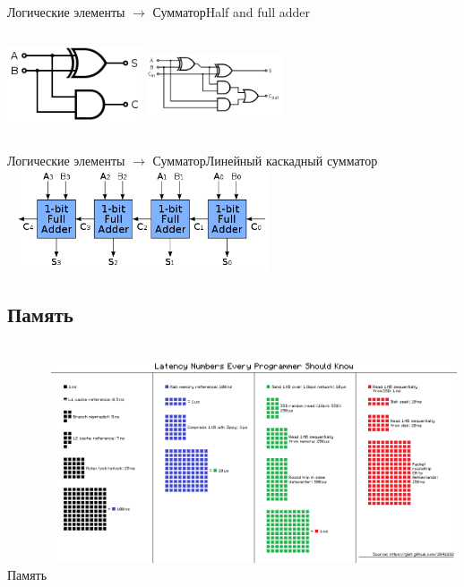 \begin{frame}[fragile]{Логические элементы $\rightarrow$ Сумматор}{Half and full adder}
\begin{multicols}{2}
\includegraphics[width=4cm, height=3cm]{Term_1/Source/Pirctures/Half_Adder.png}
\vfill\eject
\includegraphics[width=4cm, height=3cm]{Term_1/Source/Pirctures/Full_Adder.png}
\end{multicols}
\end{frame}

\begin{frame}[fragile]{Логические элементы $\rightarrow$ Сумматор}{Линейный каскадный сумматор}
\includegraphics[width=8cm, height=3cm]{Term_1/Source/Pirctures/Ripple_carry_adder.png}
\end{frame}


\subsection{Память}
\begin{frame}[fragile]{Память}
\includegraphics[width=12cm, height=7cm]{Term_1/Source/Pirctures/latency.png}
\end{frame}

